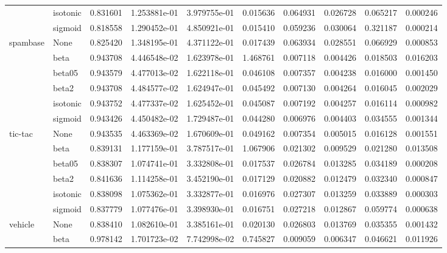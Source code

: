 \begin{tabular}{llrrrrrrrr}
        & isotonic &  0.831601 &  1.253881e-01 &  3.979755e-01 &   0.015636 &  0.064931 &  0.026728 &  0.065217 &  0.000246 \\
        & sigmoid &  0.818558 &  1.290452e-01 &  4.850921e-01 &   0.015410 &  0.059236 &  0.030064 &  0.321187 &  0.000214 \\
spambase & None &  0.825420 &  1.348195e-01 &  4.371122e-01 &   0.017439 &  0.063934 &  0.028551 &  0.066929 &  0.000853 \\
        & beta &  0.943708 &  4.446548e-02 &  1.623978e-01 &   1.468761 &  0.007118 &  0.004426 &  0.018503 &  0.016203 \\
        & beta05 &  0.943579 &  4.477013e-02 &  1.622118e-01 &   0.046108 &  0.007357 &  0.004238 &  0.016000 &  0.001450 \\
        & beta2 &  0.943708 &  4.484577e-02 &  1.624947e-01 &   0.045492 &  0.007130 &  0.004264 &  0.016045 &  0.002029 \\
        & isotonic &  0.943752 &  4.477337e-02 &  1.625452e-01 &   0.045087 &  0.007192 &  0.004257 &  0.016114 &  0.000982 \\
        & sigmoid &  0.943426 &  4.450482e-02 &  1.729487e-01 &   0.044280 &  0.006976 &  0.004403 &  0.034555 &  0.001344 \\
tic-tac & None &  0.943535 &  4.463369e-02 &  1.670609e-01 &   0.049162 &  0.007354 &  0.005015 &  0.016128 &  0.001551 \\
        & beta &  0.839131 &  1.177159e-01 &  3.787517e-01 &   1.067906 &  0.021302 &  0.009529 &  0.021280 &  0.013508 \\
        & beta05 &  0.838307 &  1.074741e-01 &  3.332808e-01 &   0.017537 &  0.026784 &  0.013285 &  0.034189 &  0.000208 \\
        & beta2 &  0.841636 &  1.114258e-01 &  3.452190e-01 &   0.017129 &  0.020882 &  0.012479 &  0.032340 &  0.000847 \\
        & isotonic &  0.838098 &  1.075362e-01 &  3.332877e-01 &   0.016976 &  0.027307 &  0.013259 &  0.033889 &  0.000303 \\
        & sigmoid &  0.837779 &  1.077476e-01 &  3.398930e-01 &   0.016751 &  0.027218 &  0.012867 &  0.059774 &  0.000638 \\
vehicle & None &  0.838410 &  1.082610e-01 &  3.385161e-01 &   0.020130 &  0.026803 &  0.013769 &  0.035355 &  0.001432 \\
        & beta &  0.978142 &  1.701723e-02 &  7.742998e-02 &   0.745827 &  0.009059 &  0.006347 &  0.046621 &  0.011926 \\

\end{tabular}
